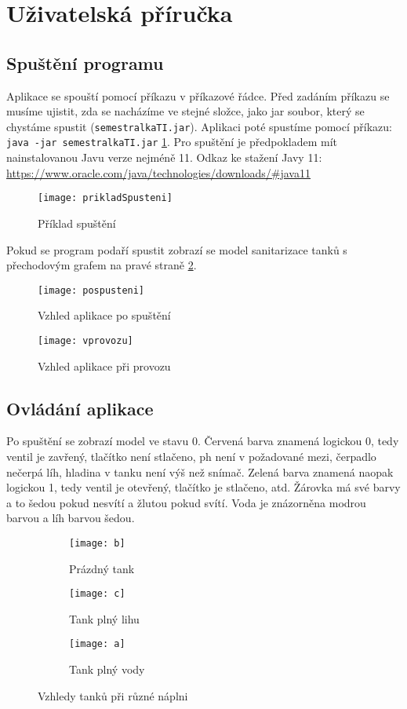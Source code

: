 \documentclass[12pt, a4paper]{article}
\begin{document}
\section{Uživatelská příručka}

\subsection{Spuštění programu}
Aplikace se spouští pomocí příkazu v příkazové řádce. Před zadáním příkazu se musíme ujistit, zda se nacházíme ve stejné složce, jako jar soubor, který se chystáme spustit (\texttt{semestralkaTI.jar}). Aplikaci poté spustíme pomocí příkazu: \texttt{java -jar semestralkaTI.jar} \ref{spusteni}. Pro spuštění je předpokladem mít nainstalovanou Javu verze nejméně 11. Odkaz ke stažení Javy 11: \url{ https://www.oracle.com/java/technologies/downloads/#java11}

\begin{figure}[h]
\centering 
\texttt{[image: prikladSpusteni]}
\caption{Příklad spuštění}
\label{spusteni}
\end{figure}

Pokud se program podaří spustit zobrazí se model sanitarizace tanků s přechodovým grafem na pravé straně \ref{vzhled}.

\begin{figure}[h]
\centering 
\texttt{[image: pospusteni]}
\caption{Vzhled aplikace po spuštění}
\label{vzhled}
\end{figure}

\begin{figure}[h]
\centering 
\texttt{[image: vprovozu]}
\caption{Vzhled aplikace při provozu}
\end{figure}

\subsection{Ovládání aplikace}
Po spuštění se zobrazí model ve stavu 0. Červená barva znamená logickou 0, tedy ventil je zavřený, tlačítko není stlačeno, ph není v požadované mezi, čerpadlo nečerpá líh, hladina v tanku není výš než snímač. Zelená barva znamená naopak logickou 1, tedy ventil je otevřený, tlačítko je stlačeno, atd. Žárovka má své barvy a to šedou pokud nesvítí a žlutou pokud svítí. Voda je znázorněna modrou barvou a líh barvou šedou.

\begin{figure}[h]
\centering
\begin{subfigure}{0.3\textwidth}
    \texttt{[image: b]}
    \caption{Prázdný tank}
\end{subfigure}
\hfill
\begin{subfigure}{0.3\textwidth}
    \texttt{[image: c]}
    \caption{Tank plný lihu}
\end{subfigure}
\hfill
\begin{subfigure}{0.3\textwidth}
    \texttt{[image: a]}
    \caption{Tank plný vody}
\end{subfigure}
        
\caption{Vzhledy tanků při různé náplni}
\end{figure}
\end{document}
